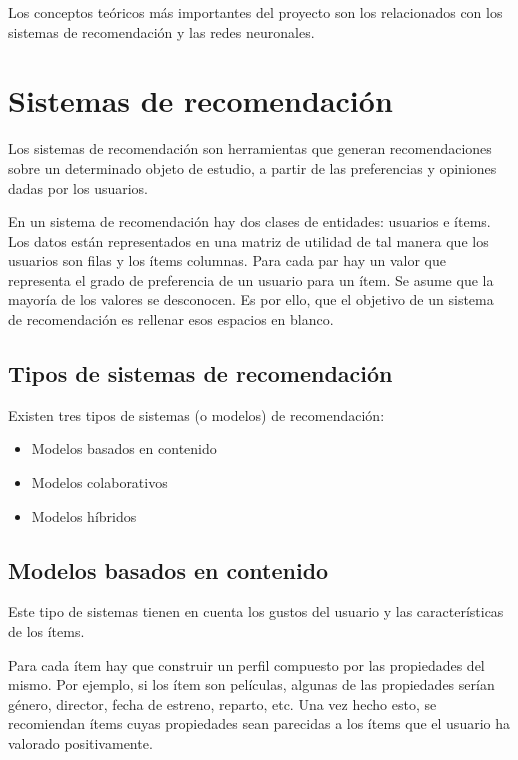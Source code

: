 
Los conceptos teóricos más importantes del proyecto son los relacionados con los sistemas de recomendación y las redes neuronales.

\section{Sistemas de recomendación}\label{sistemas-de-recomendacion}
Los sistemas de recomendación son herramientas que generan recomendaciones sobre un determinado objeto de estudio, a partir de las preferencias y opiniones dadas por los usuarios. \cite{sistemas-recomendacion}

En un sistema de recomendación hay dos clases de entidades: usuarios e ítems. Los datos están representados en una matriz de utilidad de tal manera que los usuarios son filas y los ítems columnas. Para cada par hay un valor que representa el grado de preferencia de un usuario para un ítem. Se asume que la mayoría de los valores se desconocen. Es por ello, que el objetivo de un sistema de recomendación es rellenar esos espacios en blanco.

\subsection{Tipos de sistemas de recomendación}\label{tipos-sistemas-recomendacion}
Existen tres tipos de sistemas (o modelos) de recomendación:
\begin{itemize}
\tightlist
\item Modelos basados en contenido
\item Modelos colaborativos
\item Modelos híbridos
\end{itemize}

\subsection{Modelos basados en contenido}\label{content-based-systems}
Este tipo de sistemas tienen en cuenta los gustos del usuario y las características de los ítems.

Para cada ítem hay que construir un perfil compuesto por las propiedades del mismo. Por ejemplo, si los ítem son películas, algunas de las propiedades serían género, director, fecha de estreno, reparto, etc. Una vez hecho esto, se recomiendan ítems cuyas propiedades sean parecidas a los ítems que el usuario ha valorado positivamente.

